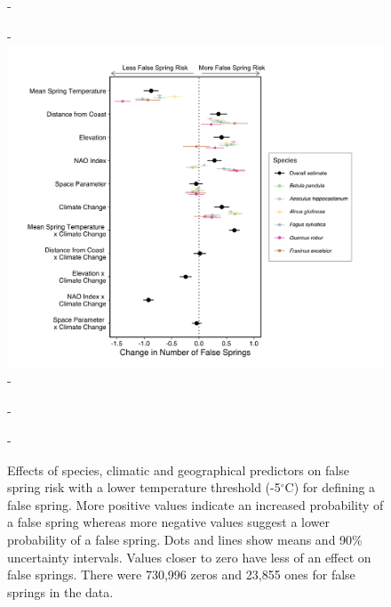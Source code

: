 \documentclass{article}\usepackage[]{graphicx}\usepackage[]{color}
\begin{document}
{\begin{figure} [H]
  -\begin{center}
  -\includegraphics[width=12cm]{..//analyses/figures/model_output_90_fivespp.png}
  -\caption{Effects of species, climatic and geographical predictors on false spring risk with a lower temperature threshold (-5$^{\circ}$C) for defining a false spring. More positive values indicate an increased probability of a false spring whereas more negative values suggest a lower probability of a false spring. Dots and lines show means and 90\% uncertainty intervals. Values closer to zero have less of an effect on false springs. There were 730,996 zeros and 23,855 ones for false springs in the data.}\label{fig:five}
  -\end{center}
  -\end{figure}}
  
\end{document}
